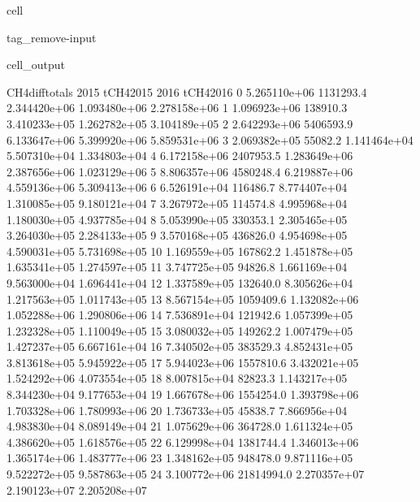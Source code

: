 \documentclass[letterpaper,10pt,english]{jupyterBook}
\begin{document}
\begin{sphinxuseclass}{cell}
\begin{sphinxuseclass}{tag_remove-input}
\begin{sphinxVerbatimOutput}
\begin{sphinxuseclass}{cell_output}
\begin{sphinxVerbatim}[commandchars=\\\{\}]
    CH4\PYGZus{}diff\PYGZus{}totals        2015     tCH4\PYGZus{}2015          2016     tCH4\PYGZus{}2016  \PYGZbs{}
0     \PYGZhy{}5.265110e+06   1131293.4  2.344420e+06  1.093480e+06  2.278158e+06   
1     \PYGZhy{}1.096923e+06    138910.3  3.410233e+05  1.262782e+05  3.104189e+05   
2     \PYGZhy{}2.642293e+06   5406593.9  6.133647e+06  5.399920e+06  5.859531e+06   
3      2.069382e+05     55082.2  1.141464e+04  5.507310e+04  1.334803e+04   
4      6.172158e+06   2407953.5  1.283649e+06  2.387656e+06  1.023129e+06   
5     \PYGZhy{}8.806357e+06   4580248.4  6.219887e+06  4.559136e+06  5.309413e+06   
6      6.526191e+04    116486.7  8.774407e+04  1.310085e+05  9.180121e+04   
7      3.267972e+05    114574.8  4.995968e+04  1.180030e+05  4.937785e+04   
8      5.053990e+05    330353.1  2.305465e+05  3.264030e+05  2.284133e+05   
9     \PYGZhy{}3.570168e+05    436826.0  4.954698e+05  4.590031e+05  5.731698e+05   
10     1.169559e+05    167862.2  1.451878e+05  1.635341e+05  1.274597e+05   
11     3.747725e+05     94826.8  1.661169e+04  9.563000e+04  1.696441e+04   
12     1.337589e+05    132640.0  8.305626e+04  1.217563e+05  1.011743e+05   
13    \PYGZhy{}8.567154e+05   1059409.6  1.132082e+06  1.052288e+06  1.290806e+06   
14     7.536891e+04    121942.6  1.057399e+05  1.232328e+05  1.110049e+05   
15     3.080032e+05    149262.2  1.007479e+05  1.427237e+05  6.667161e+04   
16    \PYGZhy{}7.340502e+05    383529.3  4.852431e+05  3.813618e+05  5.945922e+05   
17     5.944023e+06   1557810.6  3.432021e+05  1.524292e+06  4.073554e+05   
18    \PYGZhy{}8.007815e+04     82823.3  1.143217e+05  8.344230e+04  9.177653e+04   
19     1.667678e+06   1554254.0  1.393798e+06  1.703328e+06  1.780993e+06   
20    \PYGZhy{}1.736733e+05     45838.7  7.866956e+04  4.983830e+04  8.089149e+04   
21     1.075629e+06    364728.0  1.611324e+05  4.386620e+05  1.618576e+05   
22    \PYGZhy{}6.129998e+04   1381744.4  1.346013e+06  1.365174e+06  1.483777e+06   
23    \PYGZhy{}1.348162e+05    948478.0  9.871116e+05  9.522272e+05  9.587863e+05   
24    \PYGZhy{}3.100772e+06  21814994.0  2.270357e+07  2.190123e+07  2.205208e+07   


\end{sphinxVerbatim}
\end{sphinxuseclass}
\end{sphinxVerbatimOutput}
\end{sphinxuseclass}
\end{sphinxuseclass}
\end{document}

